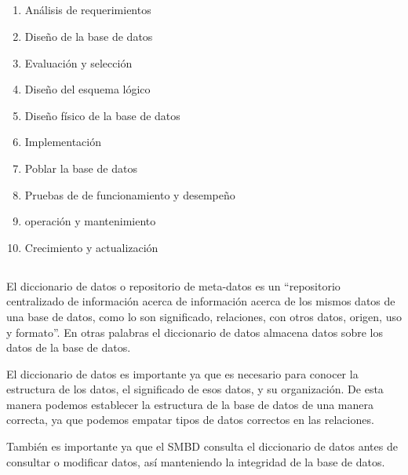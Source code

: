 \documentclass{article}
\begin{document}
\subsection{}
\begin{enumerate}
    \item Análisis de requerimientos
    \item Diseño de la base de datos
    \item Evaluación y selección
    \item Diseño del esquema lógico 
    \item Diseño físico de la base de datos
    \item Implementación
    \item Poblar la base de datos
    \item Pruebas de de funcionamiento y desempeño
    \item operación y mantenimiento
    \item Crecimiento y actualización 
\end{enumerate}
\subsection{}
El diccionario de datos o repositorio de
meta-datos es un “repositorio centralizado de información acerca de información acerca de
los mismos datos de una base de datos, como lo son significado, relaciones, con otros datos,
origen, uso y formato”. En otras palabras el diccionario de datos almacena datos sobre los datos de la base
de datos.
\\\par

El diccionario de datos es importante ya que es necesario para conocer la estructura de los datos, el significado de esos datos, y su organización.
De esta manera podemos establecer la estructura de la base de datos de una manera correcta, ya que podemos empatar tipos de datos correctos en las relaciones.
\\\par También es importante ya que el SMBD consulta el diccionario de datos antes de consultar o modificar
datos, así manteniendo la integridad de la base de datos.
\end{document}
